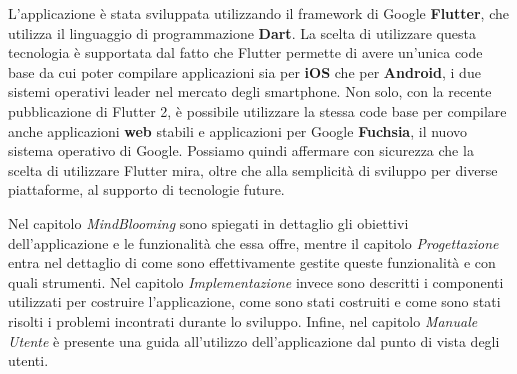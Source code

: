 L'applicazione è stata sviluppata utilizzando il framework di Google \textbf{Flutter}, che utilizza il linguaggio di programmazione \textbf{Dart}. La scelta di utilizzare questa tecnologia è supportata dal fatto che Flutter permette di avere un'unica code base da cui poter compilare applicazioni sia per \textbf{iOS} che per \textbf{Android}, i due sistemi operativi leader nel mercato degli smartphone.
Non solo, con la recente pubblicazione di Flutter 2, è possibile utilizzare la stessa code base per compilare anche applicazioni \textbf{web} stabili e applicazioni per Google \textbf{Fuchsia}, il nuovo sistema operativo di Google. Possiamo quindi affermare con sicurezza che la scelta di utilizzare Flutter mira, oltre che alla semplicità di sviluppo per diverse piattaforme, al supporto di tecnologie future.

Nel capitolo \textit{MindBlooming} sono spiegati in dettaglio gli obiettivi dell'applicazione e le funzionalità che essa offre, mentre il capitolo \textit{Progettazione} entra nel dettaglio di come sono effettivamente gestite queste funzionalità e con quali strumenti. Nel capitolo \textit{Implementazione} invece sono descritti i componenti utilizzati per costruire l'applicazione, come sono stati costruiti e come sono stati risolti i problemi incontrati durante lo sviluppo. Infine, nel capitolo \textit{Manuale Utente} è presente una guida all'utilizzo dell'applicazione dal punto di vista degli utenti.
